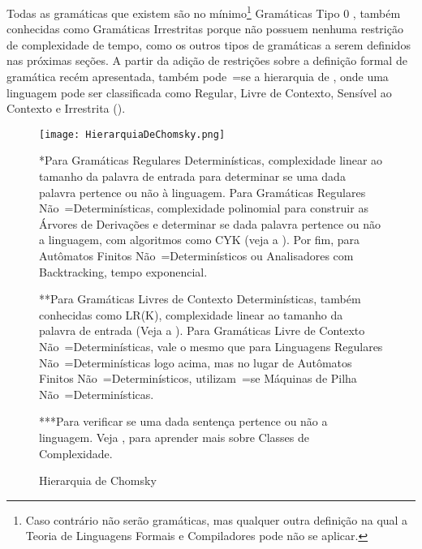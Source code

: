 Todas as gramáticas que existem são no mínimo\footnote{
Caso contrário não serão gramáticas,
mas qualquer outra definição na qual a Teoria de Linguagens Formais e
Compiladores pode não se aplicar.
}
Gramáticas Tipo 0 \cite{ahoTheoryOfParsing,chomskyGrammars1956},
também conhecidas como Gramáticas Irrestritas porque não possuem nenhuma restrição de complexidade de tempo,
como os outros tipos de gramáticas a serem definidos nas próximas seções{}.
A partir da adição de restrições sobre a definição formal de gramática recém apresentada,
também pode~=se  a hierarquia de ,
onde uma linguagem pode ser classificada como Regular,
Livre de Contexto,
Sensível ao Contexto e
Irrestrita ().
\begin{figure}[!htb]
\caption{Hierarquia de Chomsky}
\label{FigureHierarquiaDeChomsky}
\centering
\texttt{[image: HierarquiaDeChomsky.png]}
\begin{minipage}{\textwidth} \footnotesize
*Para Gramáticas Regulares Determinísticas,
complexidade linear ao tamanho da palavra de entrada para determinar se uma dada palavra pertence ou
não à linguagem.
Para Gramáticas Regulares Não~=Determinísticas,
complexidade polinomial para construir as Árvores de Derivações e
determinar se dada palavra pertence ou
não a linguagem,
com algoritmos como CYK (veja a ).
Por fim,
para Autômatos Finitos Não~=Determinísticos ou
Analisadores com Backtracking,
tempo exponencial.

**Para Gramáticas Livres de Contexto Determinísticas,
também conhecidas como LR(K),
complexidade linear ao tamanho da palavra de entrada (Veja a ).
Para Gramáticas Livre de Contexto Não~=Determinísticas,
vale o mesmo que para Linguagens Regulares Não~=Determinísticas logo acima,
mas no lugar de Autômatos Finitos Não~=Determinísticos,
utilizam~=se Máquinas de Pilha Não~=Determinísticas.

***Para verificar se uma dada sentença pertence ou
não a linguagem.
Veja ,
para aprender mais sobre Classes de Complexidade.
\end{minipage}
\end{figure}


